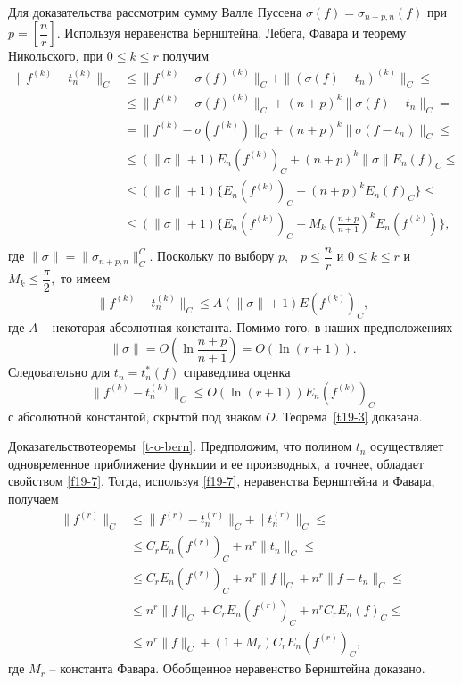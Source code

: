 

 Для доказательства рассмотрим  сумму Валле Пуссена
 $\sigma(f)=\sigma_{n+p,n}(f)$ при  $p=\left[
 \dfrac{n}{r}\right].$ Используя неравенства Бернштейна, Лебега,
 Фавара и теорему Никольского, при $0\le k\le r$  получим
 $$
 \begin{aligned}
 \|f^{(k)}-{t}_n^{(k)}\|_C &\le
 \|f^{(k)}-\sigma(f)^{(k)}\|_C+
 \|(\sigma(f)-{t}_n)^{(k)}\|_C\le\\
 &\le \|f^{(k)}-\sigma(f)^{(k)}\|_C+
 (n+p)^k \|\sigma(f)-{t}_n\|_C=\\
 &=\|f^{(k)}-\sigma(f^{(k)})\|_C+
 (n+p)^k \|\sigma(f-{t}_n)\|_C\le\\
 &\le (\|\sigma\|+1) E_{n}(f^{(k)})_C+(n+p)^k
 \|\sigma\|E_{n}(f)_C\le \\
 &\le (\|\sigma\|+1) \Big\{ E_{n}(f^{(k)})_C+(n+p)^k E_n(f)_C\Big\}\le\\
 &\le (\|\sigma\|+1) \Big\{ E_{n}(f^{(k)})_C+ M_k\left( \frac{n+p}{n+1}
 \right)^k E_n(f^{(k)})\Big\},\\
 \end{aligned}
 $$
 {где $\|\sigma\|=\|\sigma_{n+p,n}\|_C^C$.}
  Поскольку по выбору  $p,$~ $p\le \dfrac{n}{r}$ и $0\le k\le r$ и
  $M_k\le \dfrac{\pi}{2},$ то имеем
 $$
\|f^{(k)}-{t}_n^{(k)}\|_C\le A(\|\sigma\|+1) E(f^{(k)})_C,
 $$
где $A$ -- некоторая абсолютная константа. Помимо того, в наших предположениях
$$
\|\sigma\|= O\left(\ln \frac{n+p}{n+1}\right)=O(\ln(r+1)).
$$
Следовательно для $t_n=t_n^*(f)$ справедлива оценка
 $$
 \|f^{(k)}-{t}_n^{(k)}\|_C\le O(\ln(r+1)) E_n(f^{(k)})_C
 $$
 с абсолютной константой, скрытой под знаком $O.$ Теорема~\ref{t19-3} доказана.


 Д\;о\;к\;а\;з\;а\;т\;е\;л\;ь\;с\;т\;в\;о\quad теоремы~\ref{t-o-bern}.
  Предположим, что полином {$t_n$} осуществляет одновременное
 приближение функции и ее производных,
 а точнее, обладает свойством {\eqref{f19-7}}.
 Тогда, используя   {\eqref{f19-7}}, неравенства Бернштейна
 и Фавара, получаем
 $$
 \begin{aligned}
 \|f^{(r)}\|_C &\le \|f^{(r)}-{t}_n^{(r)}\|_C+\|{t}_n^{(r)}\|_C\le\\
 &\le C_rE_n(f^{(r)})_C+n^r\|{t}_n\|_C\le \\
 &\le C_rE_n(f^{(r)})_C+n^r\|f\|_C+n^r\|f-{t}_n\|_C\le \\
 &\le n^r\|f\|_C+C_rE_n(f^{(r)})_C+n^r C_r E_n(f)_C \le \\
 &\le n^r\|f\|_C+(1+{M_r})C_rE_n(f^{(r)})_C,
 \end{aligned}
 $$
 где {$M_r$} -- константа {Фавара}. Обобщенное неравенство
 Бернштейна доказано.

